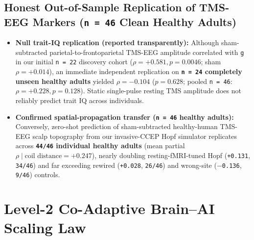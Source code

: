 \documentclass[11pt,a4paper]{article}
\begin{document}
\subsection{Honest Out-of-Sample Replication of TMS-EEG Markers (\texttt{n = 46} Clean Healthy Adults)}
\begin{itemize}
\item \textbf{Null trait-IQ replication (reported transparently):} Although sham-subtracted parietal-to-frontoparietal TMS-EEG amplitude correlated with \texttt{g} in our initial \texttt{n = 22} discovery cohort ($\rho = +0.581, p = 0.0046$; sham $\rho = +0.014$), an immediate independent replication on \textbf{\texttt{n = 24} completely unseen healthy adults} yielded $\rho = -0.104$ ($p = 0.628$; pooled \texttt{n = 46}: $\rho = +0.228, p = 0.128$). Static single-pulse resting TMS amplitude does not reliably predict trait IQ across individuals.
\item \textbf{Confirmed spatial-propagation transfer (\texttt{n = 46} healthy adults):} Conversely, zero-shot prediction of sham-subtracted healthy-human TMS-EEG scalp topography from our invasive-CCEP Hopf simulator replicates across \textbf{\texttt{44/46} individual healthy adults} (mean partial $\rho \mid \text{coil distance} = +0.247$), nearly doubling resting-fMRI-tuned Hopf (\texttt{+0.131}, \texttt{34/46}) and far exceeding rewired (\texttt{+0.028}, \texttt{26/46}) and wrong-site (\texttt{$-$0.136}, \texttt{9/46}) controls.
\end{itemize}
\section{Level-2 Co-Adaptive Brain--AI Scaling Law}
\end{document}
